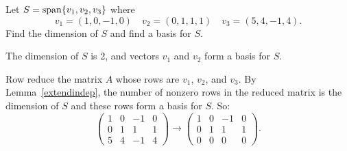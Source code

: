 \documentclass{ximera}
\begin{document}
\begin{exercise} \label{c5.5.2}
Let $S={\rm span}\{v_1,v_2,v_3\}$ where
\[
v_1=(1,0,-1,0) \quad v_2=(0,1,1,1) \quad v_3=(5,4,-1,4).
\]
Find the dimension of $S$ and find a basis for $S$.

\begin{solution}

\ans The dimension of $S$ is 2, and vectors $v_1$ and $v_2$ form a
basis for $S$.

\soln Row reduce the matrix $A$ whose rows are $v_1$, $v_2$, and $v_3$. 
By Lemma~\ref{extendindep}, the number
of nonzero rows in the reduced matrix is the dimension of $S$ and these
rows form a basis for $S$.  So:
\[
\left(\begin{array}{rrrr} 1 & 0 & -1 & 0 \\ 0 & 1 & 1 & 1 \\ 5
& 4 & -1 & 4 \end{array}\right) \longrightarrow \left(\begin{array}
{rrrr} 1& 0 & -1 & 0 \\ 0 & 1 & 1 & 1 \\ 0 & 0 & 0 & 0
\end{array}\right).
\]

\end{solution}
\end{exercise}
\end{document}
